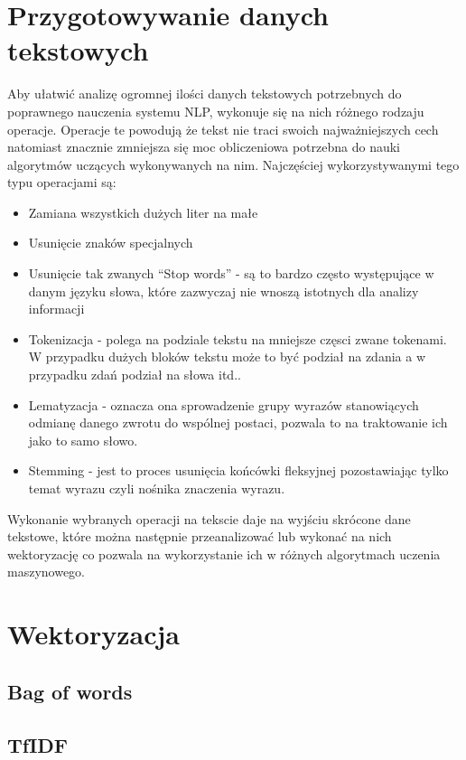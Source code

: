\section{Przygotowywanie danych tekstowych}
Aby ułatwić analizę ogromnej ilości danych tekstowych potrzebnych do poprawnego nauczenia systemu NLP,
wykonuje się na nich różnego rodzaju operacje. Operacje te powodują że tekst nie traci swoich najważniejszych cech 
natomiast znacznie zmniejsza się moc obliczeniowa potrzebna do nauki algorytmów uczących wykonywanych na nim. 
Najczęściej wykorzystywanymi tego typu operacjami są: 
\begin{itemize}
    \item Zamiana wszystkich dużych liter na małe
    \item Usunięcie znaków specjalnych  
    \item Usunięcie tak zwanych ``Stop words'' - są to bardzo często występujące w danym języku słowa, które 
    zazwyczaj nie wnoszą istotnych dla analizy informacji
    \item Tokenizacja - polega na podziale tekstu na mniejsze częsci zwane tokenami. W przypadku dużych bloków 
    tekstu może to być podział na zdania a w przypadku zdań podział na słowa itd..
    \item Lematyzacja - oznacza ona sprowadzenie grupy wyrazów stanowiących odmianę danego zwrotu do wspólnej postaci,
    pozwala to na traktowanie ich jako to samo słowo.
    \item Stemming - jest to proces usunięcia końcówki fleksyjnej pozostawiając tylko temat wyrazu czyli nośnika znaczenia 
    wyrazu.
\end{itemize}
Wykonanie wybranych operacji na tekscie daje na wyjściu skrócone dane tekstowe, które można następnie przeanalizować lub 
wykonać na nich wektoryzację co pozwala na wykorzystanie ich w różnych algorytmach uczenia maszynowego. 
\section{Wektoryzacja}

\subsection{Bag of words}

\subsection{TfIDF}
